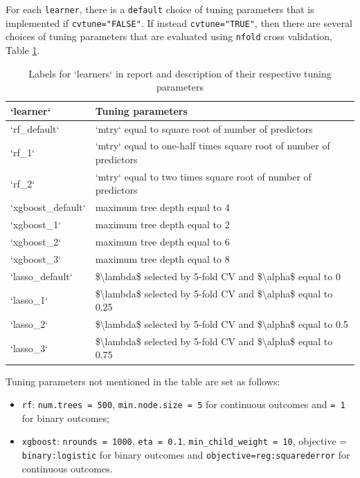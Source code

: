 \documentclass[]{article}
\providecommand{\tightlist}{%
  \setlength{\itemsep}{0pt}\setlength{\parskip}{0pt}}
\begin{document}
For each \texttt{learner}, there is a \texttt{default} choice of tuning
parameters that is implemented if \texttt{cvtune="FALSE"}. If instead
\texttt{cvtune="TRUE"}, then there are several choices of tuning
parameters that are evaluated using \texttt{nfold} cross validation,
Table \ref{tab:learners}.

\begin{table}

\caption{\label{tab:learners}Labels for `learners` in report and description of their respective tuning parameters}
\centering
\begin{tabular}[t]{l|l}
\hline
`learner` & Tuning parameters\\
\hline
`rf\_default` & `mtry` equal to square root of number of predictors\\
\hline
`rf\_1` & `mtry` equal to one-half times square root of number of predictors\\
\hline
`rf\_2` & `mtry` equal to two times square root of number of predictors\\
\hline
`xgboost\_default` & maximum tree depth equal to 4\\
\hline
`xgboost\_1` & maximum tree depth equal to 2\\
\hline
`xgboost\_2` & maximum tree depth equal to 6\\
\hline
`xgboost\_3` & maximum tree depth equal to 8\\
\hline
`lasso\_default` & \$\textbackslash{}lambda\$ selected by 5-fold CV and \$\textbackslash{}alpha\$ equal to 0\\
\hline
`lasso\_1` & \$\textbackslash{}lambda\$ selected by 5-fold CV and \$\textbackslash{}alpha\$ equal to 0.25\\
\hline
`lasso\_2` & \$\textbackslash{}lambda\$ selected by 5-fold CV and \$\textbackslash{}alpha\$ equal to 0.5\\
\hline
`lasso\_3` & \$\textbackslash{}lambda\$ selected by 5-fold CV and \$\textbackslash{}alpha\$ equal to 0.75\\
\hline
\end{tabular}
\end{table}

Tuning parameters not mentioned in the table are set as follows:

\begin{itemize}
\tightlist
\item
  \texttt{rf}: \texttt{num.trees\ =\ 500}, \texttt{min.node.size\ =\ 5}
  for continuous outcomes and \texttt{=\ 1} for binary outcomes;
\item
  \texttt{xgboost}: \texttt{nrounds\ =\ 1000}, \texttt{eta\ =\ 0.1},
  \texttt{min\_child\_weight\ =\ 10}, objective =
  \texttt{binary:logistic} for binary outcomes and
  \texttt{objective=reg:squarederror} for continuous outcomes.
\end{itemize}
\end{document}
